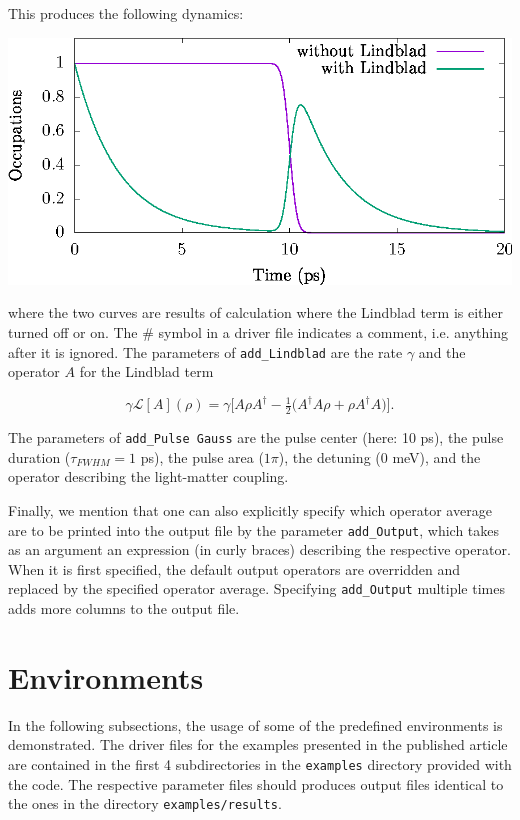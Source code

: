\documentclass{scrartcl}
\begin{document}
This produces the following dynamics:

\includegraphics[width=20cm]{figs/example2.eps}

where the two curves are results of calculation where the Lindblad term is
either turned off or on. The \# symbol in a driver file indicates a comment, 
i.e. anything after it is ignored. The parameters of \texttt{add\_Lindblad}
are the rate $\gamma$ and the operator $A$ for the Lindblad term

\begin{equation}
\gamma \mathcal{L}[A](\rho)=\gamma\bigg[ A\rho A^\dagger 
-\tfrac 12\big(A^\dagger A\rho +\rho A^\dagger A \big)\bigg].
\end{equation}

The parameters of \verb+add_Pulse Gauss+ are the pulse center (here: 10 ps),
the pulse duration ($\tau_{FWHM}=1$ ps), the pulse area ($1 \pi$), the
detuning ($0$ meV), and the operator describing the light-matter coupling.

Finally, we mention that one can also explicitly specify which operator
average are to be printed into the output file by the parameter 
\verb+add_Output+, which takes as an argument an expression (in curly braces)
describing the respective operator. When it is first specified, the default
output operators are overridden and replaced by the specified operator average.
Specifying \verb+add_Output+ multiple times adds more columns to the output 
file.

\section{Environments}
In the following subsections, the usage of some of the predefined environments 
is demonstrated.
The driver files for the examples presented in the published article 
are contained in the first 4 subdirectories in the \texttt{examples} 
directory provided with the code. The respective parameter files should 
produces output files identical to the ones in the directory 
\texttt{examples/results}.
\end{document}
